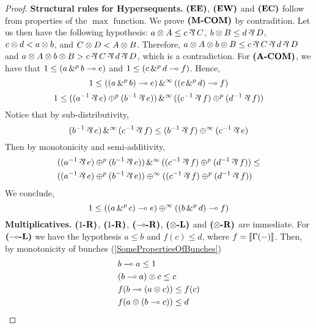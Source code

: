 \begin{proof}
    \textbf{Structural rules for Hypersequents.} ${\normalfont \textbf{(EE)}}$, ${\normalfont \textbf{(EW)}}$ and ${\normalfont \textbf{(EC)}}$ follow from properties of the $\max$ function. We prove ${\normalfont \textbf{(M-COM)}}$ by contradition. Let us then have the following hypothesis: $a \conmul{} A \leq c \dismul{} C$, $b \conmul{} B \leq d \dismul{} D$, $c \otimes{} d < a \otimes{} b$, and $C \otimes{} D < A \otimes{} B$. Therefore, 
    $a \conmul{} A \conmul{} b \conmul{} B \leq c \dismul{} C \dismul{} d \dismul{} D$ and $a \conmul{} A \conmul{} b \conmul{} B > c \dismul{} C \dismul{} d \dismul{} D$,
    which is a contradiction. For ${\normalfont \textbf{(A-COM)}}{}$, we have that $1 \leq (a\,\&^{p}\,b \multimap{} e)$ and $1 \leq (c \,\&^{p}\,d \multimap{} f)$. Hence,
    $$1 \leq ((a\,\&^{p}\,b) \multimap{} e) \,\&^{\infty}\, ((c \,\&^{p}\,d) \multimap{} f)$$
    $$1 \leq ((\edual{a} \dismul{} e) \psum{p} (\edual{b} \dismul{} e)) \phsum{\infty} ((\edual{c} \dismul{} f) \psum{p} (\edual{d} \dismul{} f))$$
    Notice that by sub-distributivity,
    $$
    (\edual{b}\dismul{}e) \phsum{\infty} (\edual{c}\dismul{}f) \leq (\edual{b}\dismul{}f) \psum{\infty} (\edual{c}\dismul{}e)
    $$
    Then by monotonicity and semi-additivity,
    \begin{equation}
        \begin{split}
            & ((\edual{a} \dismul{} e) \psum{p} (\edual{b} \dismul{} e)) \phsum{\infty} ((\edual{c} \dismul{} f) \psum{p} (\edual{d} \dismul{} f)) \leq \\
            & ((\edual{a} \dismul{} e) \psum{p} (\edual{b} \dismul{} e)) \psum{\infty} ((\edual{c} \dismul{} f) \psum{p} (\edual{d} \dismul{} f))
        \end{split}
    \end{equation}
We conclude,
$$
1 \leq ((a\,\&^{p}\,c) \multimap{} e) \oplus^{\infty} ((b \,\&^{p}\,d) \multimap{} f)
$$
    \textbf{Multiplicatives.} ${\normalfont \textbf{($1$-R)}}$, ${\normalfont \textbf{($1$-R)}}$, ${\normalfont \textbf{($\multimap$-R)}}$, ${\normalfont \textbf{($\otimes $-L)}}$ and ${\normalfont \textbf{($\otimes $-R)}}$ are immediate. For ${\normalfont \textbf{($\multimap$-L)}}$ we have the hypothesis $a \leq b$ and $f(c) \leq d$, where $f = \llbracket \Gamma(-) \rrbracket$. Then, by monotonicity of bunches (\cref{SomePropertiesOfBunches})
    \begin{equation}
        \begin{split}
            & b \multimap{} a \leq 1\\
            & (b \multimap{} a) \otimes{} c \leq c\\
            & f(b \multimap{} (a \otimes{} c)) \leq f(c)\\
            & f(a \otimes{} (b \multimap{} c)) \leq d\\
        \end{split}
    \end{equation}
    

\end{proof}
